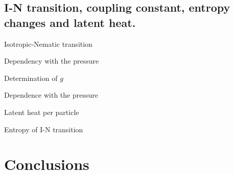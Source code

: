 \documentclass{beamer}
\begin{document}
\subsection{I-N transition, coupling constant, entropy changes and latent heat.}

\begin{frame}{Isotropic-Nematic transition}
    
\end{frame}

\begin{frame}{Dependency with the pressure}
    
\end{frame}

\begin{frame}{Determination of $g$}
    
\end{frame}

\begin{frame}{Dependence with the pressure}
    
\end{frame}

\begin{frame}{Latent heat per particle}
    
\end{frame}

\begin{frame}{Entropy of I-N transition}
    
\end{frame}

\section{Conclusions}
\end{document}
